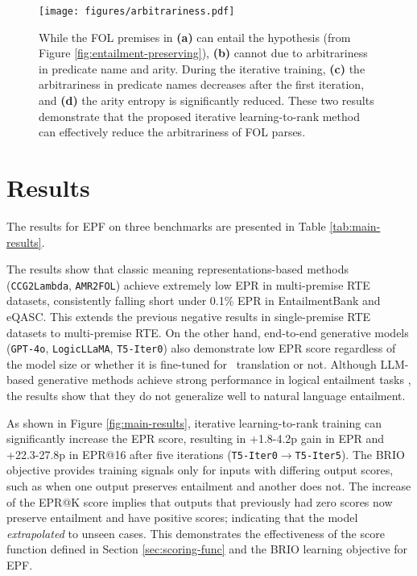 
\begin{figure*}[t]
    \centering
    \texttt{[image: figures/arbitrariness.pdf]}
    \caption{While the FOL premises in \textbf{(a)} can entail the hypothesis (from Figure \ref{fig:entailment-preserving}), \textbf{(b)} cannot due to arbitrariness in predicate name and arity. During the iterative training, \textbf{(c)} the arbitrariness in predicate names decreases after the first iteration, and \textbf{(d)} the arity entropy is significantly reduced. These two results demonstrate that the proposed iterative learning-to-rank method can effectively reduce the arbitrariness of FOL parses.}
    \label{fig:arbitrariness}
\end{figure*}

\section{Results}
\label{sec:result}

\label{sec:epr}




The results for EPF on three benchmarks are presented in Table \ref{tab:main-results}.

The results show that classic meaning representations-based methods (\texttt{CCG2Lambda}, \texttt{AMR2FOL}) achieve extremely low EPR in multi-premise RTE datasets, consistently falling short under 0.1\% EPR in EntailmentBank and eQASC. This extends the previous negative results in single-premise RTE datasets \citep{bos-nli, whenlihelps} to multi-premise RTE. On the other hand, end-to-end generative models (\texttt{GPT-4o}, \texttt{LogicLLaMA}, \texttt{T5-Iter0}) also demonstrate low EPR score regardless of the model size or whether it is fine-tuned for \nltofol\ translation or not. Although LLM-based generative methods achieve strong performance in logical entailment tasks \citep{logiclm, linc}, the results show that they do not generalize well to natural language entailment.

As shown in Figure \ref{fig:main-results}, iterative learning-to-rank training can significantly increase the EPR score, resulting in +1.8-4.2p gain in EPR and +22.3-27.8p in EPR@16 after five iterations (\texttt{T5-Iter0}$\rightarrow$\texttt{T5-Iter5}). The BRIO objective provides training signals only for inputs with differing output scores, such as when one output preserves entailment and another does not. The increase of the EPR@K score implies that outputs that previously had zero scores now preserve entailment and have positive scores; indicating that the model \textit{extrapolated} to unseen cases. This demonstrates the effectiveness of the score function defined in Section \ref{sec:scoring-func} and the BRIO learning objective for EPF.

